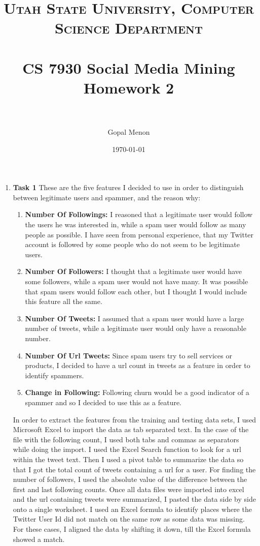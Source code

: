 \documentclass[paper=a4, fontsize=11pt]{scrartcl} %
\title{	
\normalfont \normalsize 
\textsc{Utah State University, Computer Science Department} \\ [25pt] %
\horrule{0.5pt} \\[0.4cm] %
\huge CS 7930 Social Media Mining\\Homework 2\\ %
\horrule{2pt} \\[0.5cm] %
}
\author{Gopal Menon} %
\date{\normalsize\today} %
\numberwithin{equation}{section} %
\numberwithin{figure}{section} %
\numberwithin{table}{section} %
\begin{document}
\maketitle %

\begin{enumerate}

\item \textbf{Task 1} These are the five features I decided to use in order to distinguish between legitimate users and spammer, and the reason why:

\begin{enumerate}

\item \textbf{Number Of Followings:} I reasoned that a legitimate user would follow the users he was interested in, while a spam user would follow as many people as possible. I have seen from personal experience, that my Twitter account is followed by some people who do not seem to be legitimate users.

\item \textbf{Number Of Followers:} I thought that a legitimate user would have some followers, while a spam user would not have many. It was possible that spam users would follow each other, but I thought I would include this feature all the same.

\item \textbf{Number Of Tweets:} I assumed that a spam user would have a large number of tweets, while a legitimate user would only have a reasonable number.

\item \textbf{Number Of Url Tweets:} Since spam users try to sell services or products, I decided to have a url count in tweets as a feature in order to identify spammers.

\item \textbf{Change in Following:} Following churn would be a good indicator of a spammer and so I decided to use this as a feature.

\end{enumerate}

In order to extract the features from the training and testing data sets, I used Microsoft Excel to import the data as tab separated text. In the case of the file with the following count, I used both tabs and commas as separators while doing the import. I used the Excel Search function to look for a url within the tweet text. Then I used a pivot table to summarize the data so that I got the total count of tweets containing a url for a user. For finding the number of followers, I used the absolute value of the difference between the first and last following counts. Once all data files were imported into excel and the url containing tweets were summarized, I pasted the data side by side onto a single worksheet. I used an Excel formula to identify places where the Twitter User Id did not match on the same row as some data was missing. For these cases, I aligned the data by shifting it down, till the Excel formula showed a match. 


\end{enumerate}
\end{document}
